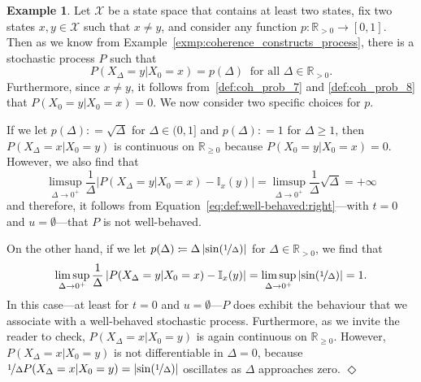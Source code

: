 \documentclass[10pt,a4paper]{paper}
\theoremstyle{definition}
\newtheorem{exmp}{Example}%
\newcommand{\reals}{\mathbb{R}}
\newcommand{\realspos}{\reals_{>0}}
\newcommand{\states}{\mathcal{X}}
\newcommand{\ind}[1]{\mathbb{I}_{#1}}
\newcommand{\abs}[1]{\left\vert #1 \right\vert}
\newcommand{\coloneqq}{:\!=}
\newcommand{\exampleend}{\hfill$\Diamond$}
\begin{document}






\begin{exmp}\label{exmp:well-behaved}
Let $\states$ be a state space that contains at least two states, fix two states $x,y\in\states$ such that $x\neq y$, and consider any function $p:\reals_{>0}\to[0,1]$. Then as we know from Example~\ref{exmp:coherence_constructs_process}, there is a stochastic process $P$ such that
\begin{equation*}
P(X_\Delta=y\vert X_0=x)=p(\Delta)
~\text{ for all $\Delta\in\realspos$.}
\end{equation*}
Furthermore, since $x\neq y$, it follows from~\ref{def:coh_prob_7} and \ref{def:coh_prob_8} that $P(X_0=y\vert X_0=x)=0$. We now consider two specific choices for $p$.

If we let $p(\Delta)\coloneqq\sqrt\Delta$ for $\Delta\in(0,1]$ and $p(\Delta)\coloneqq 1$ for $\Delta\geq1$, then $P(X_\Delta=x\vert X_0=y)$ is continuous on $\reals_{\geq0}$ because $P(X_0=y\vert X_0=x)=0$. However, we also find that
\begin{equation*}
\limsup_{\Delta\to0^+}\frac{1}{\Delta}\abs{P(X_{\Delta}=y\vert X_{0}=x) - \ind{x}(y)}
=
\limsup_{\Delta\to0^+}\frac{1}{\Delta}\sqrt\Delta
=+\infty
\end{equation*}
and therefore, it follows from Equation~\eqref{eq:def:well-behaved:right}---with $t=0$ and $u=\emptyset$---that $P$ is not well-behaved.

On the other hand, if we let $p(\Delta)\coloneqq \Delta\abs{\sin(\nicefrac{1}{\Delta})}$ for $\Delta\in\realspos$, we find that
\begin{equation*}
\limsup_{\Delta\to0^+}\frac{1}{\Delta}\abs{P(X_{\Delta}=y\vert X_{0}=x) - \ind{x}(y)}
=
\limsup_{\Delta\to0^+}\abs{\sin(\nicefrac{1}{\Delta})}
=1.
\end{equation*}
In this case---at least for $t=0$ and $u=\emptyset$---$P$ does exhibit the behaviour that we associate with a well-behaved stochastic process. Furthermore, as we invite the reader to check, $P(X_\Delta=x\vert X_0=y)$ is again continuous on $\reals_{\geq0}$. However, $P(X_\Delta=x\vert X_0=y)$ is not differentiable in $\Delta=0$, because $\nicefrac{1}{\Delta}P(X_\Delta=x\vert X_0=y)=\abs{\sin(\nicefrac{1}{\Delta})}$ oscillates as $\Delta$ approaches zero.
\exampleend
\end{exmp}
\end{document}

